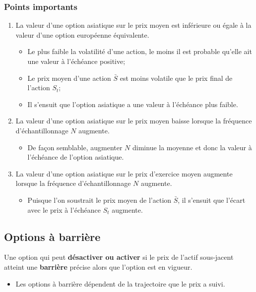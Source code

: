 \documentclass[10pt, french]{article}
\begin{document}
\begin{multicols*}{2}
\subsubsection*{Points importants}
\begin{enumerate}
	\item	La valeur d'une option asiatique sur le prix moyen est inférieure ou égale à la valeur d'une option européenne équivalente.
		\begin{itemize}[leftmargin = *]
		\item	Le plus faible la volatilité d'une action, le moins il est probable qu'elle ait une valeur à l'échéance positive;
		\item	Le prix moyen d'une action $\bar{S}$ est moins volatile que le prix final de l'action $S_{t}$;
		\item	Il s'ensuit que l'option asiatique a une valeur à l'échéance plus faible.
		\end{itemize}
	\item	La valeur d'une option asiatique sur le prix moyen baisse lorsque la fréquence d'échantillonnage $N$ augmente.
		\begin{itemize}[leftmargin = *]
		\item	De façon semblable, augmenter $N$ diminue la moyenne et donc la valeur à l'échéance de l'option asiatique.
		\end{itemize}
	\item	La valeur d'une option asiatique sur le prix d'exercice moyen augmente lorsque la fréquence d'échantillonnage $N$ augmente.
		\begin{itemize}[leftmargin = *]
		\item	Puisque l'on soustrait le prix moyen de l'action $\bar{S}$, il s'ensuit que l'écart avec le prix à l'échéance $S_{t}$ augmente.
		\end{itemize}
\end{enumerate}

\columnbreak
\subsection{Options à barrière}
\begin{definitionNOHFILL}
Une option qui peut \textbf{désactiver ou activer} si le prix de l'actif sous-jacent atteint une \textbf{barrière} précise alors que l'option est en vigueur.

\tcbline

\begin{itemize}[leftmargin = *]
	\item	Les options à barrière dépendent de la trajectoire que le prix a suivi.
\end{itemize}
\end{definitionNOHFILL}


\end{multicols*}
\end{document}
